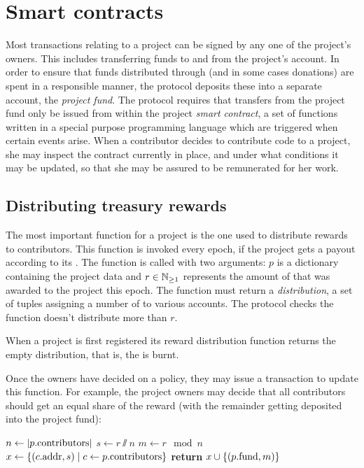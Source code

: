 
\section{Smart contracts}
\label{s:smart-contracts}

Most transactions relating to a project can be signed by any one of the
project's owners. This includes transferring funds to and from the project's
account. In order to ensure that funds distributed through \osrank{} (and
in some cases donations) are spent in a responsible manner, the protocol deposits
these into a separate account, the \emph{project fund}. The protocol requires
that transfers from the project fund only be issued from within the project
\emph{smart contract}, a set of functions written in a special purpose
programming language which are triggered when certain events arise. When a
contributor decides to contribute code to a project, she may inspect the
contract currently in place, and under what conditions it may be updated,
so that she may be assured to be remunerated for her work.

\subsection{Distributing treasury rewards}

The most important function for a project is the one used to distribute rewards
to contributors. This function is invoked every epoch, if the project gets a
payout according to its \osrank{}. The function is called with two arguments:
$p$ is a dictionary containing the project data and $r \in \mathbb{N}_{\geq 1}$ represents
the amount of \oscoin{} that was awarded to the project this epoch. The
function must return a \emph{distribution}, a set of tuples assigning a number
of \oscoin{} to various accounts. The protocol checks the function doesn't
distribute more than $r$.

When a project is first registered its reward distribution function returns the
empty distribution, that is, the \oscoin{} is burnt.

Once the owners have decided on a policy, they may issue a transaction to update
this function. For example, the project owners may decide that all contributors
should get an equal share of the reward (with the remainder getting deposited
into the project fund):
\medskip
\begin{algorithmic}[0]
        \State $n \gets |p.{\mathrm{contributors}}|$
        \State $s \gets r \sslash n$
        \State $m \gets r \mod n$
        \State $x \gets \{ (c.{\mathrm{addr}}, s) \mid c \gets p.{\mathrm{contributors}} \}$
        \State \textbf{return} $x \cup \{ (p.{\mathrm{fund}}, m) \}$
    \EndProcedure
\end{algorithmic}

